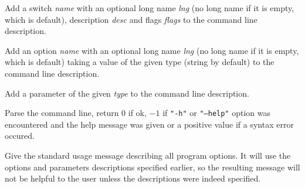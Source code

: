 \label{wxcmdlineparseraddswitch}


Add a switch {\it name} with an optional long name {\it lng} (no long name if it
is empty, which is default), description {\it desc} and flags {\it flags} to the
command line description.

\label{wxcmdlineparseraddoption}


Add an option {\it name} with an optional long name {\it lng} (no long name if
it is empty, which is default) taking a value of the given type (string by
default) to the command line description.

\label{wxcmdlineparseraddparam}


Add a parameter of the given {\it type} to the command line description.

\label{wxcmdlineparserparse}


Parse the command line, return $0$ if ok, $-1$ if {\tt "-h"} or {\tt "--help"} 
option was encountered and the help message was given or a positive value if a
syntax error occured.

\label{wxcmdlineparserusage}


Give the standard usage message describing all program options. It will use the
options and parameters descriptions specified earlier, so the resulting message
will not be helpful to the user unless the descriptions were indeed specified.



